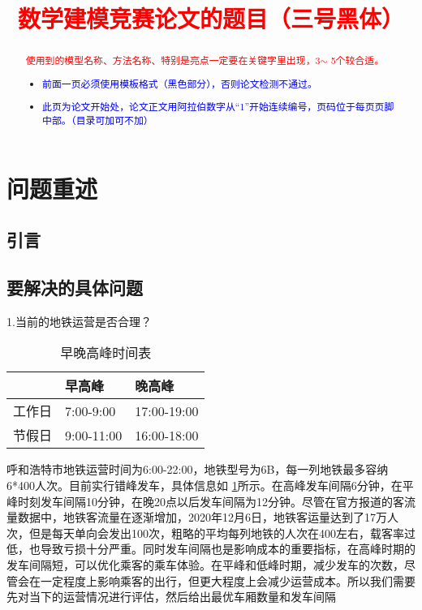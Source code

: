 \documentclass[12pt,a4paper]{mcmthesis}
\title{\textcolor{red}{数学建模竞赛论文的题目（三号黑体）}}
\date{}
\begin{document}
\begin{abstract}


\begin{keywords}
{\song\xiaosihao
\textcolor{red}{使用到的模型名称、方法名称、特别是亮点一定要在关键字里出现，3$\sim$ 5个较合适。}}
\end{keywords}

\begin{itemize}
  \item \textcolor{blue}{前面一页必须使用模板格式（黑色部分），否则论文检测不通过。}
  \item \textcolor{blue}{此页为论文开始处，论文正文用阿拉伯数字从“1”开始连续编号，页码位于每页页脚中部。（目录可加可不加）}
\end{itemize}

\end{abstract}
\maketitle
\renewcommand{\contentsname}{\centerline{\sanhao\bfseries\HEI 目\quad 录}}
\tableofcontents

\newpage
\setcounter{page}{1}
\section{问题重述}
\subsection{引言}


\subsection{要解决的具体问题}

   1.当前的地铁运营是否合理？

   \begin{table}
  	\centering
  	\begin{tabular}{|l|l|l|}
  		\hline
  		& 早高峰 & 晚高峰 \\ \hline
  		工作日 & 7:00-9:00 & 17:00-19:00 \\ \hline
  		节假日 & 9:00-11:00 & 16:00-18:00 \\ \hline
  	\end{tabular}
  	\caption{早晚高峰时间表}
  	\label{tab:早晚高峰}
  \end{table}
  呼和浩特市地铁运营时间为6:00-22:00，地铁型号为6B，每一列地铁最多容纳6*400人次。目前实行错峰发车，具体信息如 \ref{tab:早晚高峰}所示。在高峰发车间隔6分钟，在平峰时刻发车间隔10分钟，在晚20点以后发车间隔为12分钟。尽管在官方报道的客流量数据中，地铁客流量在逐渐增加，2020年12月6日，地铁客运量达到了17万人次，但是每天单向会发出100次，粗略的平均每列地铁的人次在400左右，载客率过低，也导致亏损十分严重。同时发车间隔也是影响成本的重要指标，在高峰时期的发车间隔短，可以优化乘客的乘车体验。在平峰和低峰时期，减少发车的次数，尽管会在一定程度上影响乘客的出行，但更大程度上会减少运营成本。所以我们需要先对当下的运营情况进行评估，然后给出最优车厢数量和发车间隔
\end{document}
